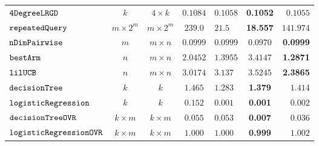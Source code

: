 {\begin {table}[t]
\begin{center}
{\begin{tabular}{|| >{\tiny}l || c | c || c || l | c | r ||  }
         \hhline{||-||--||-||---||}
         $  \mathtt{ 4DegreeLRGD }$ & $ k $ & $  4\times k $ & $0.1084$   & $0.1058$ & \textbf{0.1052} & $0.1055$  \\
         \hhline{||-||--||-||---||}
         $\mathtt{repeatedQuery}$~\cite{Jamieson2015TheAO} & $ m \times 2^m $ & $  m \times 2^m $ & $239.0$   & $21.5$ & {\textbf{18.557}} & $141.974$  \\
         \hhline{||-||--||-||---||}
         $\mathtt{nDimPairwise}$~\cite{Jamieson2015TheAO} & $ m $ & $  m \times n  $ & $0.0999$   & $0.0999$ & $0.0970$ & \textbf{0.0999}  \\
         \hhline{||-||--||-||---||}
         $\mathtt{bestArm}$~\cite{Jamieson2015TheAO} & $ n $ & $  m \times n $ & $ 2.0452$   & $ 1.3955$ & {{$3.4147$}} & \textbf{1.2871}  \\
         \hhline{||-||--||-||---||}
         $\mathtt{lilUCB}$~\cite{Jamieson2015TheAO} & $ n $ & $ m \times n $ & $3.0174$   & $ 3.137$ & {$3.5245$} & \textbf{2.3865}  \\
         \hhline{||-||--||-||---||}
         $\mathtt{decisionTree}$ & $k$ &  $k$ & $ 1.465$  & $ 1.283$ & \textbf{1.379 } & {$1.414$}  \\
         \hhline{||-||--||-||---||}
         $  \mathtt{logisticRegression}$ & $k$ &  $k$ & $ 0.152$  &  $ 0.001$ & {\textbf{0.001}} & {$0.002$}   \\
        \hhline{||-||--||-||---||}
        $  \mathtt{decisionTreeOVR}$ & $k \times m$ &  $ k \times m $ &  $0.055$ & $0.053$  &  {\textbf{0.007}} & $0.036$  \\
        \hhline{||-||--||-||---||}
        $  \mathtt{logisticRegressionOVR}$    & $k \times m$ &  $ k \times m $ &  $ 1.000  $  &  $ 1.000 $ & {\textbf{ 0.999}} & $ 1.002 $ \\

\end{tabular}}
\end{center}
\end{table}}

